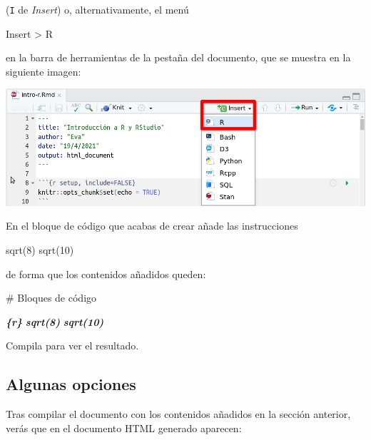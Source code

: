 \documentclass[
  title=normal,
  notoc,
  bib=normal]{mnye}
\newenvironment{Shaded}{\begin{snugshade}}{\end{snugshade}}
\newcommand{\FunctionTok}[1]{\textcolor[rgb]{0.00,0.00,0.00}{#1}}
\newcommand{\InformationTok}[1]{\textcolor[rgb]{0.56,0.35,0.01}{\textbf{\textit{#1}}}}
\newcommand{\NormalTok}[1]{#1}
\begin{document}
(\texttt{I} de \emph{Insert}) o, alternativamente, el menú

\begin{menu}
Insert \textgreater{} R

\end{menu}

en la barra de herramientas de la pestaña del documento, que se muestra en la siguiente imagen:

\begin{center}\includegraphics[width=1\linewidth]{images/insert-r} \end{center}

En el bloque de código que acabas de crear añade las instrucciones

\begin{Shaded}
\begin{Highlighting}[]
\NormalTok{sqrt(8)}
\NormalTok{sqrt(10)}
\end{Highlighting}
\end{Shaded}

de forma que los contenidos añadidos queden:

\begin{Shaded}
\begin{Highlighting}[]
\FunctionTok{\# Bloques de código}

\InformationTok{\textasciigrave{}\textasciigrave{}\textasciigrave{}\{r\}}
\InformationTok{sqrt(8)}
\InformationTok{sqrt(10)}
\InformationTok{\textasciigrave{}\textasciigrave{}\textasciigrave{}}
\end{Highlighting}
\end{Shaded}

Compila para ver el resultado.

\hypertarget{algunas-opciones}{%
\subsection{Algunas opciones}\label{algunas-opciones}}

Tras compilar el documento con los contenidos añadidos en la sección anterior, verás que en el documento HTML generado aparecen:
\end{document}
